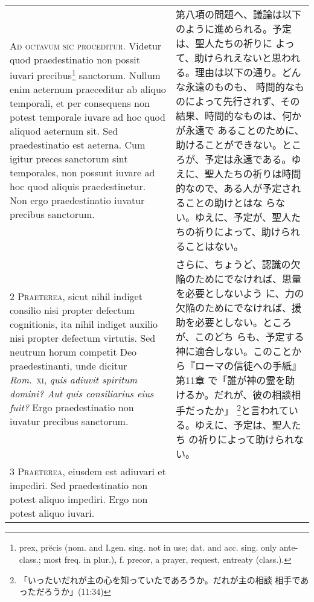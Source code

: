 \documentclass[10pt]{jsarticle} %
\begin{document}
\begin{longtable}{p{21em}p{21em}}

{\Huge A}{\scshape d octavum sic proceditur}. Videtur quod
praedestinatio non possit iuvari precibus\footnote
{prex, pr\u{e}cis (nom. and
I.gen. sing. not in use; dat. and acc. sing. only ante-class.; most freq. in plur.), f. precor, a prayer, request, entreaty (class.). 
} sanctorum. Nullum enim
aeternum praeceditur ab aliquo temporali, et per consequens non potest
temporale iuvare ad hoc quod aliquod aeternum sit. Sed praedestinatio
est aeterna. Cum igitur preces sanctorum sint temporales, non possunt
iuvare ad hoc quod aliquis praedestinetur. Non ergo praedestinatio
iuvatur precibus sanctorum.


&

第八項の問題へ、議論は以下のように進められる。予定は、聖人たちの祈りに
よって、助けられえないと思われる。理由は以下の通り。どんな永遠のものも、
時間的なものによって先行されず、その結果、時間的なものは、何かが永遠で
あることのために、助けることができない。ところが、予定は永遠である。ゆ
えに、聖人たちの祈りは時間的なので、ある人が予定されることの助けとはな
らない。ゆえに、予定が、聖人たちの祈りによって、助けられることはない。


\\


{\scshape 2 Praeterea}, sicut nihil indiget consilio
nisi propter defectum cognitionis, ita nihil indiget auxilio nisi
propter defectum virtutis. Sed neutrum horum competit Deo
praedestinanti, unde dicitur {\itshape Rom}.~{\scshape xi}, {\itshape quis adiuvit spiritum domini? Aut
quis consiliarius eius fuit?} Ergo praedestinatio non iuvatur precibus
sanctorum.


&

さらに、ちょうど、認識の欠陥のためにでなければ、思量を必要としないよう
 に、力の欠陥のためにでなければ、援助を必要としない。ところが、このどち
 らも、予定する神に適合しない。このことから『ローマの信徒への手紙』第11章
 で「誰が神の霊を助けるか。だれが、彼の相談相手だったか」
 \footnote{「いったいだれが主の心を知っていたであろうか。だれが主の相談
 相手であっただろうか」(11:34)}と言われている。ゆえに、予定は、聖人たち
 の祈りによって助けられない。


\\


{\scshape 3 Praeterea}, eiusdem est adiuvari et
impediri. Sed praedestinatio non potest aliquo impediri. Ergo non potest
aliquo iuvari.


&


\end{longtable}
\end{document}
